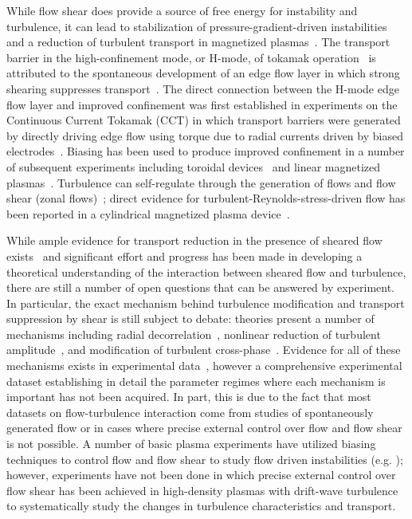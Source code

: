 \documentclass[aps,prl,amsmath,amssymb,preprint,superscriptaddress]{revtex4} %
\begin{document}
While flow shear does provide a source of free energy for instability and turbulence, it can lead to stabilization of pressure-gradient-driven instabilities and a reduction of turbulent transport in magnetized plasmas~\cite{burrell97, terry00}.  The transport barrier in the high-confinement mode, or H-mode, of tokamak operation~\cite{wagner07} is attributed to the spontaneous development of an edge flow layer in which  strong shearing suppresses transport~\cite{burrell97, terry00}.  The direct connection between the H-mode edge flow layer and improved confinement was first established in experiments on the Continuous Current Tokamak (CCT) in which transport barriers were generated by directly driving edge flow using torque due to radial currents driven by biased electrodes~\cite{taylor89}.  Biasing has been used to produce improved confinement in a number of subsequent experiments including toroidal devices~\cite{weynants92,boedo02,silva06,peleman07} and linear magnetized plasmas~\cite{sakai93,maggs07,carter09}. Turbulence can self-regulate through the generation of flows and flow shear (zonal flows)~\cite{terry00}; direct evidence for turbulent-Reynolds-stress-driven flow has been reported in a cylindrical magnetized plasma device~\cite{holland06}. 

While ample evidence for transport reduction in the presence of sheared flow exists~\cite{burrell99, tynan09} and significant effort and progress has been made in developing a theoretical understanding of the interaction between sheared flow and turbulence, there are still a number of open questions that can be answered by
experiment.  In particular, the exact mechanism behind turbulence modification and transport suppression by shear is still subject to debate: theories present a number of mechanisms including radial decorrelation~\cite{biglari90}, nonlinear reduction of turbulent amplitude~\cite{kim04}, and modification of turbulent cross-phase~\cite{ware96}.  %
Evidence for all of these mechanisms exists in experimental data~\cite{tynan09,boedo02}, however a comprehensive experimental dataset establishing in detail the parameter regimes where each mechanism is important has not been acquired.  In part, this is due to
the fact that most datasets on flow-turbulence interaction come from studies of spontaneously generated flow or in cases where precise external control over flow and flow shear is not possible.  A number of basic plasma experiments have utilized biasing techniques to control
flow and flow shear to study flow driven instabilities (e.g. \cite{amatucci96,jass72}); however, experiments have not been done in which precise external control over flow shear has been achieved in high-density plasmas with drift-wave turbulence to systematically study the changes in turbulence characteristics and transport.
\end{document}
